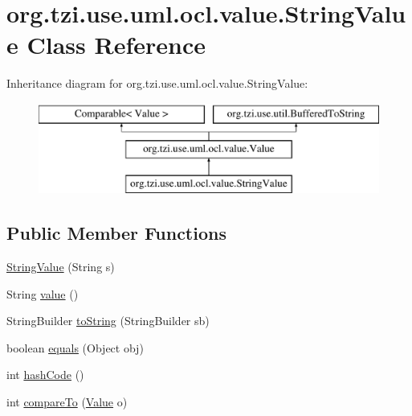\hypertarget{classorg_1_1tzi_1_1use_1_1uml_1_1ocl_1_1value_1_1_string_value}{\section{org.\-tzi.\-use.\-uml.\-ocl.\-value.\-String\-Value Class Reference}
\label{classorg_1_1tzi_1_1use_1_1uml_1_1ocl_1_1value_1_1_string_value}
}
Inheritance diagram for org.\-tzi.\-use.\-uml.\-ocl.\-value.\-String\-Value\-:\begin{figure}[H]
\begin{center}
\leavevmode
\includegraphics[height=3.000000cm]{classorg_1_1tzi_1_1use_1_1uml_1_1ocl_1_1value_1_1_string_value}
\end{center}
\end{figure}
\subsection*{Public Member Functions}
\begin{DoxyCompactItemize}
\item 
\hyperlink{classorg_1_1tzi_1_1use_1_1uml_1_1ocl_1_1value_1_1_string_value_ae0b856bae6830dc52c12357f26a4fda0}{String\-Value} (String s)
\item 
String \hyperlink{classorg_1_1tzi_1_1use_1_1uml_1_1ocl_1_1value_1_1_string_value_a05994b003f86853fb426153b41fce768}{value} ()
\item 
String\-Builder \hyperlink{classorg_1_1tzi_1_1use_1_1uml_1_1ocl_1_1value_1_1_string_value_ad72b6701bf1d7257e7ca5834f929ef95}{to\-String} (String\-Builder sb)
\item 
boolean \hyperlink{classorg_1_1tzi_1_1use_1_1uml_1_1ocl_1_1value_1_1_string_value_a7967a98d9e944f141b76dae18876574b}{equals} (Object obj)
\item 
int \hyperlink{classorg_1_1tzi_1_1use_1_1uml_1_1ocl_1_1value_1_1_string_value_a3bc1153d4d7e3a8ff76bab61c71bbd24}{hash\-Code} ()
\item 
int \hyperlink{classorg_1_1tzi_1_1use_1_1uml_1_1ocl_1_1value_1_1_string_value_a6e20d63c9f9eb9170f9406a86faa1e29}{compare\-To} (\hyperlink{classorg_1_1tzi_1_1use_1_1uml_1_1ocl_1_1value_1_1_value}{Value} o)
\end{DoxyCompactItemize}
